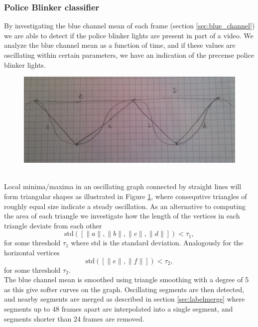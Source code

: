 \subsubsection{Police Blinker classifier}\label{sec:police_detection}
%
By investigating the blue channel mean of each frame (section \ref{sec:blue_channel}) we are able to detect if the police blinker lights are present in part of a video.%
We analyze the blue channel mean as a function of time, and if these values are oscillating within certain parameters,%
we have an indication of the precense police blinker lights.
%
\begin{figure}[h]
     \centering
     \includegraphics[width=1.05\textwidth]{img/triangles.jpg}
     \caption{}\label{fig:triangles}
\end{figure}\\
Local minima/maxima in an oscillating graph connected by straight lines will form triangular shapes as illustrated in Figure \ref{fig:triangles}, where consequtive triangles of roughly equal size indicate a steady oscillation. As an alternative to computing the area of each triangle we investigate how the length of the vertices in each triangle deviate from each other
\[
\text{std}([\|a\|,\|b\|,\|c\|,\|d\|]) < \tau_1,
\]
for some threshold $\tau_1$ where std is the standard deviation. Analogously for the horizontal vertices
\[
\text{std}([\|e\|,\|f\|]) < \tau_2,
\]
for some threshold $\tau_2$.\\
The blue channel mean is smoothed using triangle smoothing with a degree of 5%
as this give softer curves on the graph. Oscillating segments are then detected, and nearby segments are merged as described in section \ref{sec:labelmerge} where segments up to 48 frames%
 apart are interpolated into a single segment, and segments shorter than 24 frames%
  are removed.
%
